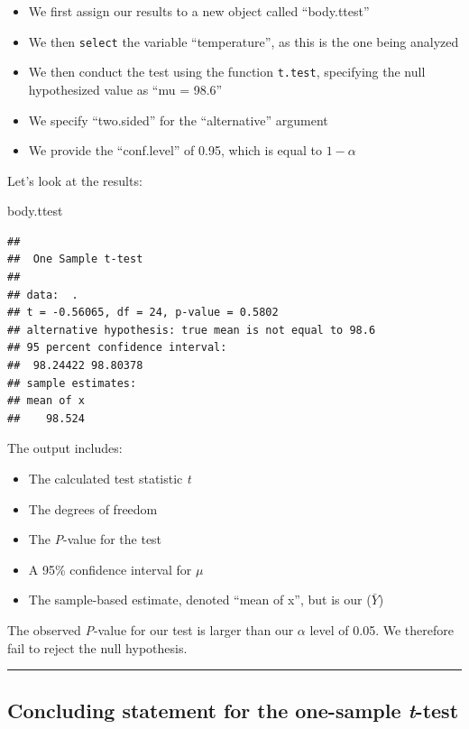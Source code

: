 \documentclass[
]{book}
\newenvironment{Shaded}{\begin{snugshade}}{\end{snugshade}}
\newcommand{\NormalTok}[1]{#1}
\providecommand{\tightlist}{%
  \setlength{\itemsep}{0pt}\setlength{\parskip}{0pt}}
\begin{document}
\begin{itemize}
\tightlist
\item
  We first assign our results to a new object called ``body.ttest''
\item
  We then \texttt{select} the variable ``temperature'', as this is the one being analyzed
\item
  We then conduct the test using the function \texttt{t.test}, specifying the null hypothesized value as ``mu = 98.6''
\item
  We specify ``two.sided'' for the ``alternative'' argument
\item
  We provide the ``conf.level'' of 0.95, which is equal to \(1-\alpha\)
\end{itemize}

Let's look at the results:

\begin{Shaded}
\begin{Highlighting}[]
\NormalTok{body.ttest}
\end{Highlighting}
\end{Shaded}

\begin{verbatim}
## 
##  One Sample t-test
## 
## data:  .
## t = -0.56065, df = 24, p-value = 0.5802
## alternative hypothesis: true mean is not equal to 98.6
## 95 percent confidence interval:
##  98.24422 98.80378
## sample estimates:
## mean of x 
##    98.524
\end{verbatim}

The output includes:

\begin{itemize}
\tightlist
\item
  The calculated test statistic \emph{t}
\item
  The degrees of freedom
\item
  The \emph{P}-value for the test
\item
  A 95\% confidence interval for \(\mu\)
\item
  The sample-based estimate, denoted ``mean of x'', but is our (\(\bar{Y}\))
\end{itemize}

The observed \emph{P}-value for our test is larger than our \(\alpha\) level of 0.05. We therefore fail to reject the null hypothesis.

\begin{center}\rule{0.5\linewidth}{0.5pt}\end{center}

\subsection{\texorpdfstring{Concluding statement for the one-sample \emph{t}-test}{Concluding statement for the one-sample t-test}}\label{onesamp_conclude}
\end{document}
